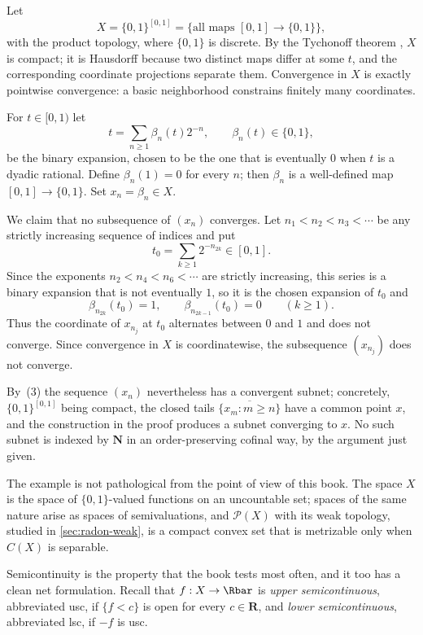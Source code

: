 \begin{example}
\label{ex:net-no-subsequence}
Let
\[
 X=\{0,1\}^{[0,1]}
 =\bigl\{\text{all maps }[0,1]\to\{0,1\}\bigr\},
\]
with the product topology, where $\{0,1\}$ is discrete.  By the Tychonoff
theorem \cite[Chapter~5]{Kel75}, $X$ is compact; it is Hausdorff because two
distinct maps differ at some $t$, and the corresponding coordinate projections
separate them.  Convergence in $X$ is exactly pointwise convergence:
a basic neighborhood constrains finitely many coordinates.

For $t\in[0,1)$ let
\[
 t=\sum_{n\geq1}\beta_n(t)2^{-n},\qquad\beta_n(t)\in\{0,1\},
\]
be the binary expansion, chosen to be the one that is eventually $0$ when $t$
is a dyadic rational.  Define $\beta_n(1)=0$ for every $n$; then $\beta_n$
is a well-defined map $[0,1]\to\{0,1\}$.  Set $x_n=\beta_n\in X$.

We claim that no subsequence of $(x_n)$ converges.  Let
$n_1<n_2<n_3<\cdots$ be any strictly increasing sequence of indices and put
\[
 t_0=\sum_{k\geq1}2^{-n_{2k}}\in[0,1].
\]
Since the exponents $n_2<n_4<n_6<\cdots$ are strictly increasing, this series
is a binary expansion that is not eventually $1$, so it is the chosen
expansion of $t_0$ and
\[
 \beta_{n_{2k}}(t_0)=1,\qquad \beta_{n_{2k-1}}(t_0)=0
 \qquad(k\geq1).
\]
Thus the coordinate of $x_{n_j}$ at $t_0$ alternates between $0$ and $1$ and
does not converge.  Since convergence in $X$ is coordinatewise, the
subsequence $(x_{n_j})$ does not converge.

By \,(3) the sequence $(x_n)$ nevertheless has a
convergent subnet; concretely, $\{0,1\}^{[0,1]}$ being compact, the closed
tails $\overline{\{x_m:m\geq n\}}$ have a common point $x$, and the
construction in the proof produces a subnet converging to $x$.  No such subnet
is indexed by $\mathbf N$ in an order-preserving cofinal way, by the argument
just given.

The example is not pathological from the point of view of this book.  The
space $X$ is the space of $\{0,1\}$-valued functions on an uncountable set;
spaces of the same nature arise as spaces of semivaluations, and
$\mathcal P(X)$ with its weak topology, studied in \cref{sec:radon-weak}, is a
compact convex set that is metrizable only when $C(X)$ is separable.
\end{example}

Semicontinuity is the property that the book tests most often, and it too has
a clean net formulation.  Recall that $f:X\to\Rbar$ is \emph{upper
semicontinuous}, abbreviated usc, if $\{f<c\}$ is open for every
$c\in\mathbf R$, and \emph{lower semicontinuous}, abbreviated lsc, if $-f$ is
usc.

